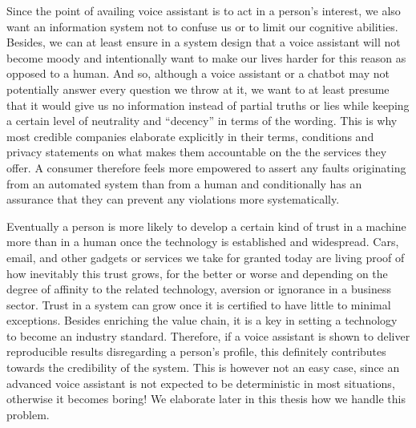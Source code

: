 Since the point of availing voice assistant is to act in a person's interest, we also want an information system not to confuse us or to limit our cognitive abilities.
Besides, we can at least ensure in a system design that a voice assistant will not become moody and intentionally want to make our lives harder for this reason as opposed to a human.
And so, although a voice assistant or a chatbot may not potentially answer every question we throw at it, we want to at least presume that it would give us no information instead of partial truths or lies while keeping a certain level of neutrality and ``decency'' in terms of the wording.
This is why most credible companies elaborate explicitly in their terms, conditions and privacy statements on what makes them accountable on the %
the services they offer.
A consumer therefore feels more empowered to assert any faults originating from an automated system than from a human and conditionally has an assurance that they can prevent any violations more systematically.

Eventually a person is more likely to develop a certain kind of trust in a machine more than in a human once the technology is established and widespread.
Cars, email, and other gadgets or services we take for granted today are living proof of how inevitably this trust grows, for the better or worse and depending on the degree of affinity to the related technology, aversion or ignorance in a business sector.
Trust in a system can grow once it is certified to have little to minimal exceptions. Besides enriching the value chain, it is a key in setting a technology to become an industry standard.
Therefore, if a voice assistant is shown to deliver reproducible results disregarding a person's profile, this definitely contributes towards the credibility of the system.
This is however not an easy case, since an advanced voice assistant is not expected to be deterministic in most situations, otherwise it becomes boring! We elaborate later in this thesis how %
we handle this problem.

